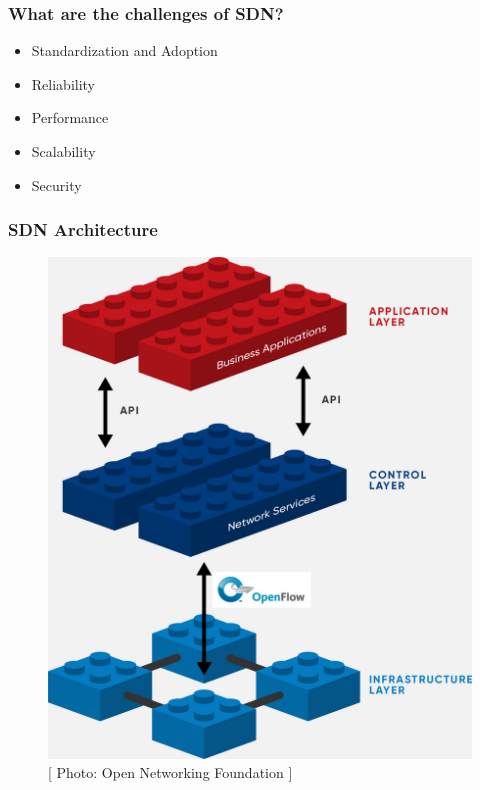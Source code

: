 \documentclass{beamer}
\begin{document}
\begin{frame}
  \frametitle{What are the challenges of SDN?}
      \begin{itemize}[<+->]
      \item[\ding{219}] Standardization and Adoption
      \item[\ding{219}] Reliability
      \item [\ding{219}] Performance
      \item [\ding{219}] Scalability
      \item [\ding{219}] Security
    \end{itemize}
\end{frame}


\begin{frame}
  \frametitle{SDN Architecture}
  \begin{figure}
    \begin{center}
      \includegraphics[scale=0.125]{images/sdn-10}
    \end{center}
    \vspace{0.5cm}
    \caption{\small{[ Photo: Open Networking Foundation ]}}
  \end{figure}
\end{frame}
\end{document}
